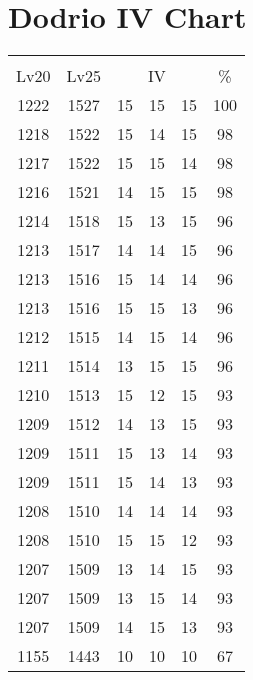 \documentclass{article}%
\begin{document}
%
\normalsize%
\section{Dodrio IV Chart}%
\label{sec:Dodrio IV Chart}%
\renewcommand{\arraystretch}{1.5}%
\begin{tabular}{|c|c|c|c|c|c|}%
\hline%
\multicolumn{6}{|c|}{\textcolor{white}{ 
\linebreak{Dodrio}
}%
\cellcolor{black}}\\%
\multicolumn{1}{|c}{Lv20}&\multicolumn{1}{c|}{Lv25}&\multicolumn{3}{c|}{IV}&\multicolumn{1}{|c|}{\%}\\%
\hline%
\rowcolor{color100}%
1222&1527&15&15&15&100\\%
\hline%
\rowcolor{color98}%
1218&1522&15&14&15&98\\%
\hline%
\rowcolor{color98}%
1217&1522&15&15&14&98\\%
\hline%
\rowcolor{color98}%
1216&1521&14&15&15&98\\%
\hline%
\rowcolor{color96}%
1214&1518&15&13&15&96\\%
\hline%
\rowcolor{color96}%
1213&1517&14&14&15&96\\%
\hline%
\rowcolor{color96}%
1213&1516&15&14&14&96\\%
\hline%
\rowcolor{color96}%
1213&1516&15&15&13&96\\%
\hline%
\rowcolor{color96}%
1212&1515&14&15&14&96\\%
\hline%
\rowcolor{color96}%
1211&1514&13&15&15&96\\%
\hline%
\rowcolor{color93}%
1210&1513&15&12&15&93\\%
\hline%
\rowcolor{color93}%
1209&1512&14&13&15&93\\%
\hline%
\rowcolor{color93}%
1209&1511&15&13&14&93\\%
\hline%
\rowcolor{color93}%
1209&1511&15&14&13&93\\%
\hline%
\rowcolor{color93}%
1208&1510&14&14&14&93\\%
\hline%
\rowcolor{color93}%
1208&1510&15&15&12&93\\%
\hline%
\rowcolor{color93}%
1207&1509&13&14&15&93\\%
\hline%
\rowcolor{color93}%
1207&1509&13&15&14&93\\%
\hline%
\rowcolor{color93}%
1207&1509&14&15&13&93\\%
\hline%
\rowcolor{color91}%
1155&1443&10&10&10&67\\%
\end{tabular}

%
\end{document}
